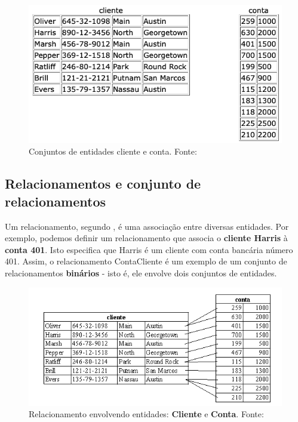 \begin{figure}[H]
	\centering
	\includegraphics[scale=0.6]{imagens/tabela1.png}
	\caption{
		Conjuntos de entidades cliente e conta.
		Fonte: \cite{fundamentos2005Sanches}
	}
	\label{fig:client-conta-1}
\end{figure}

\subsection{Relacionamentos e conjunto de relacionamentos}

Um relacionamento, segundo , é uma associação entre diversas entidades. Por exemplo, podemos definir um relacionamento que associa o \textbf{cliente Harris} à \textbf{conta 401}. Isto especifica que Harris é um cliente com conta bancária número 401. Assim, o relacionamento ContaCliente é um exemplo de um conjunto de relacionamentos \textbf{binários} - isto é, ele envolve dois conjuntos de entidades.

\begin{figure}[H]
	\centering
	\includegraphics[scale=0.7]{imagens/relacionamento.png}
	\caption{
		Relacionamento envolvendo entidades: \textbf{Cliente} e \textbf{Conta}.
		Fonte: \cite{fundamentos2005Sanches}
	}
	\label{fig:relacionamento-1}
\end{figure}

